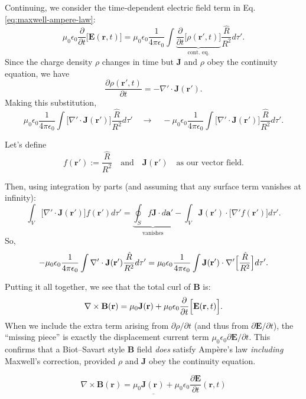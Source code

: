 \documentclass[a4paper,12pt]{article} %
\begin{document}
Continuing, we consider the time‐dependent electric field term in Eq. \eqref{eq:maxwell-ampere-law}:
\begin{equation}
  \mu_0 \epsilon_0 \frac{\partial}{\partial t}\Big[\mathbf{E}(\mathbf{r},t)\Big]= \mu_0 \epsilon_0 \frac{1}{4\pi\epsilon_0}\int
  \underbrace{\frac{\partial}{\partial t}\Big[\rho(\mathbf{r}',t)\Big]}_{\text{cont. eq.}}
  \frac{\hat{R}}{R^2}d\tau'.
\label{eq:displacement-current-term}
\end{equation}
Since the charge density $\rho$ changes in time but $\mathbf{J}$ and $\rho$ obey the continuity equation, we have
$$
  \frac{\partial \rho(\mathbf{r}',t)}{\partial t}=
  -\nabla' \cdot \mathbf{J}(\mathbf{r}').
$$
Making this substitution,
$$
  \mu_0 \epsilon_0 \frac{1}{4\pi\epsilon_0}
  \int 
  \bigl[\nabla' \cdot \mathbf{J}(\mathbf{r}')\bigr]
  \frac{\hat{R}}{R^2}d\tau'
  \quad\longrightarrow\quad
  -\mu_0 \epsilon_0 \frac{1}{4\pi\epsilon_0}
  \int 
  \bigl[\nabla' \cdot \mathbf{J}(\mathbf{r}')\bigr]
  \frac{\hat{R}}{R^2}d\tau'.
$$

Let's define
$$
  f(\mathbf{r}') := \frac{\hat{R}}{R^2}
  \quad\text{and}\quad
  \mathbf{J}(\mathbf{r}')
  \quad\text{as our vector field.}
$$

Then, using integration by parts (and assuming that any surface term vanishes at infinity):
$$
  \int_{V} \bigl[\nabla' \cdot \mathbf{J}(\mathbf{r}')\bigr]
  f(\mathbf{r}')d\tau'=\underbrace{\oint_{S} f \mathbf{J}\cdot d\mathbf{a}'}_{\text{vanishes}} -\int_{V} \mathbf{J}(\mathbf{r}') \cdot \bigl[\nabla' f(\mathbf{r}')\bigr] d\tau'.
$$
So, 
$$
  -\mu_0 \epsilon_0 \frac{1}{4\pi\epsilon_0}
  \int \nabla' \cdot \mathbf{J}(\mathbf{r}') \frac{\hat{R}}{R^2}
  d\tau'=\mu_0 \epsilon_0 \frac{1}{4\pi\epsilon_0} \int \mathbf{J}(\mathbf{r}') \cdot \nabla' \Bigl[\frac{\hat{R}}{R^2}\Big] d\tau'.
$$

Putting it all together, we see that the total curl of $\mathbf{B}$ is:
$$
  \nabla \times \mathbf{B}(\mathbf{r})=\mu_0\mathbf{J}(\mathbf{r})+\mu_0\epsilon_0\frac{\partial}{\partial t}\Bigl[\mathbf{E}(\mathbf{r},t)\Bigr].
$$
When we include the extra term arising from 
$\partial\rho/\partial t$ (and thus from $\partial\mathbf{E}/\partial t$), the “missing piece” is exactly the displacement current term $\mu_0\epsilon_0\partial\mathbf{E}/\partial t$.  This confirms that a Biot–Savart style $\mathbf{B}$ field \emph{does} satisfy Ampère’s law \emph{including} 
Maxwell’s correction, provided $\rho$ and $\mathbf{J}$ obey the continuity equation.

$$
\underline{\boxed{
   \nabla \times \mathbf{B}(\mathbf{r})=
   \mu_0\mathbf{J}(\mathbf{r})+
   \mu_0\epsilon_0\frac{\partial \mathbf{E}}{\partial t}(\mathbf{r},t)}}
$$
\end{document}
